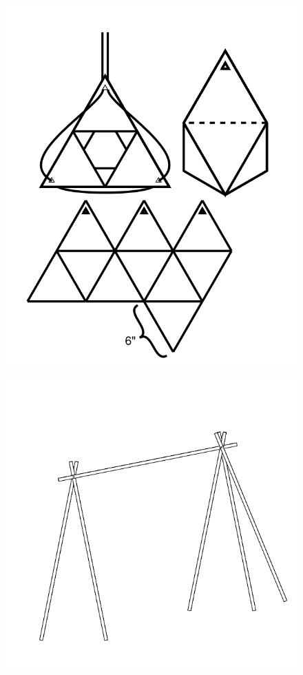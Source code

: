 \documentclass[17pt]{extreport}
\begin{document}
	\begin{figure}
		\centering
		\includegraphics[width=7.25in]{imageserver/uploadimages/artbox.png}
	\end{figure}
	
	\begin{figure}
		\centering
		\includegraphics[width=7.25in]{imageserver/uploadimages/image9.png}
	\end{figure}
\end{document}
